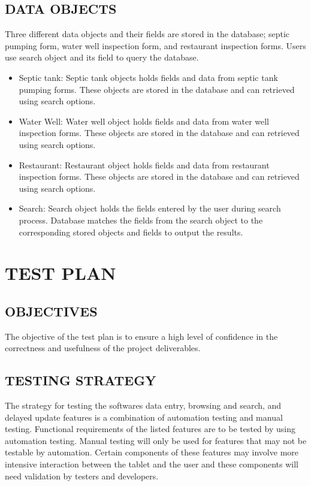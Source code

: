 \documentclass[twoside,letterpaper]{article}
\begin{document}
\subsection{DATA OBJECTS}
Three different data objects and their fields are stored in the database; septic pumping form, water well inspection form, and restaurant inspection forms.  Users use search object and its field to query the database.
\begin{itemize}
\item{Septic tank:}  Septic tank objects holds fields and data from septic tank pumping forms.  These objects are stored in the database and can retrieved using search options.

\item{Water Well:} Water well object holds fields and data from water well inspection forms.  These objects are stored in the database and can retrieved using search options.

\item{Restaurant:} Restaurant object holds fields and data from restaurant inspection forms.  These objects are stored in the database and can retrieved using search options.

\item{Search:} Search object holds the fields entered by the user during search process.  Database matches the fields from the search object to the corresponding stored objects and fields to output the results.
\end{itemize}

\clearpage\section[TEST PLAN]{\rmfamily\bfseries\color{black}
TEST PLAN}

\subsection{OBJECTIVES}
{\rmfamily\color{black}
 The objective of the test plan is to ensure a high level of confidence in the correctness and usefulness of the project deliverables.}

\subsection{TESTING STRATEGY}
{\rmfamily\color{black}
        The strategy for testing the softwares data entry, browsing and search, and delayed update features is a combination of automation testing and manual testing. Functional requirements of the listed features are to be tested by using automation testing. Manual testing will only be used for features that may not be testable by automation. Certain components of these features may involve more intensive interaction between the tablet and the user and these components will need validation by testers and developers.}
        
\end{document}
